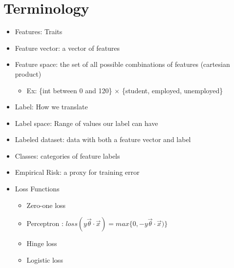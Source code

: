 
\section{Terminology}
\begin{itemize}
    \item Features: Traits
    \item Feature vector: a vector of features
    \item Feature space: the set of all possible combinations of features (cartesian product)
    \begin{itemize}
        \item Ex: \{int between 0 and 120\} $\times$ \{student, employed, unemployed\}
    \end{itemize}
    \item Label: How we translate
    \item Label space: Range of values our label can have
    \item Labeled dataset: data with both a feature vector and label
    \item Classes: categories of feature labels
    \item Empirical Risk: a proxy for training error
    \item Loss Functions
    \begin{itemize}
        \item Zero-one loss
        \item Perceptron : $loss(y\vec\theta \cdot \vec x) =max \{0, -y \vec \theta \cdot \vec x)\}$
        \item Hinge loss
        \item Logistic loss
    \end{itemize}
\end{itemize}